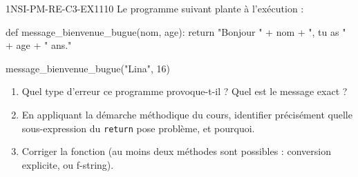 

\begin{exercice}{1NSI-PM-RE-C3-EX1}{1}{10}
Le programme suivant plante à l'exécution :
\begin{python}
def message_bienvenue_bugue(nom, age):
    return "Bonjour " + nom + ", tu as " + age + " ans."

message_bienvenue_bugue("Lina", 16)
\end{python}
\begin{enumerate}
  \item Quel type d'erreur ce programme provoque-t-il ? Quel est le message exact ?
  \item En appliquant la démarche méthodique du cours, identifier précisément quelle sous-expression du \lstinline{return} pose problème, et pourquoi.
  \item Corriger la fonction (au moins deux méthodes sont possibles : conversion explicite, ou f-string).
\end{enumerate}
\end{exercice}

